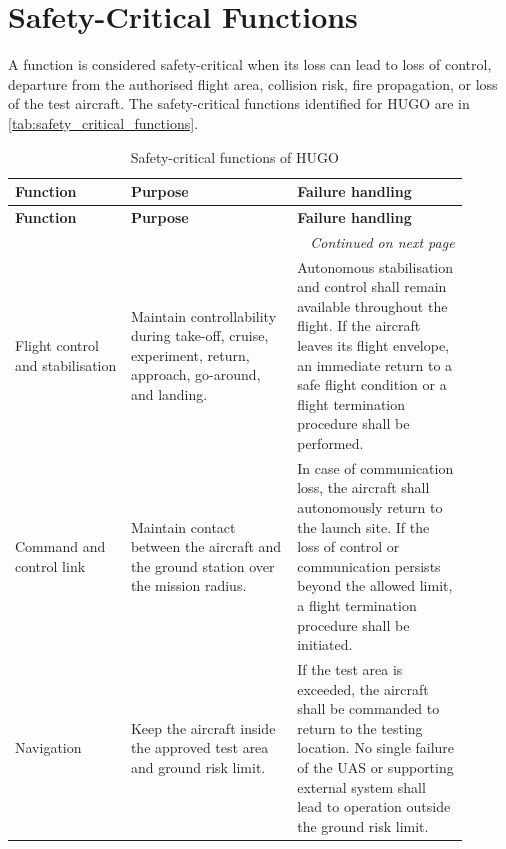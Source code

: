 \section{Safety-Critical Functions}
\label{sec:safety-critical_function}

A function is considered safety-critical when its loss can lead to loss of control, departure from the authorised flight area, collision risk, fire propagation, or loss of the test aircraft. The safety-critical functions identified for HUGO are in \autoref{tab:safety_critical_functions}.

\begin{longtable}{|p{0.23\linewidth}|p{0.33\linewidth}|p{0.34\linewidth}|}
    \caption{Safety-critical functions of HUGO}
    \label{tab:safety_critical_functions} \\

    \hline
    \textbf{Function} & \textbf{Purpose} & \textbf{Failure handling} \\
    \hline\hline
    \endfirsthead

    \hline
    \textbf{Function} & \textbf{Purpose} & \textbf{Failure handling} \\
    \hline\hline
    \endhead

    \hline
    \multicolumn{3}{r}{\textit{Continued on next page}} \\
    \hline
    \endfoot

    \hline
    \endlastfoot

    Flight control and stabilisation &
    Maintain controllability during take-off, cruise, experiment, return, approach, go-around, and landing. &
    Autonomous stabilisation and control shall remain available throughout the flight. If the aircraft leaves its flight envelope, an immediate return to a safe flight condition or a flight termination procedure shall be performed. \\
    \hline

    Command and control link &
    Maintain contact between the aircraft and the ground station over the mission radius. &
    In case of communication loss, the aircraft shall autonomously return to the launch site. If the loss of control or communication persists beyond the allowed limit, a flight termination procedure shall be initiated. \\
    \hline

    Navigation &
    Keep the aircraft inside the approved test area and ground risk limit. &
    If the test area is exceeded, the aircraft shall be commanded to return to the testing location. No single failure of the UAS or supporting external system shall lead to operation outside the ground risk limit. \\
    \hline


\end{longtable}

